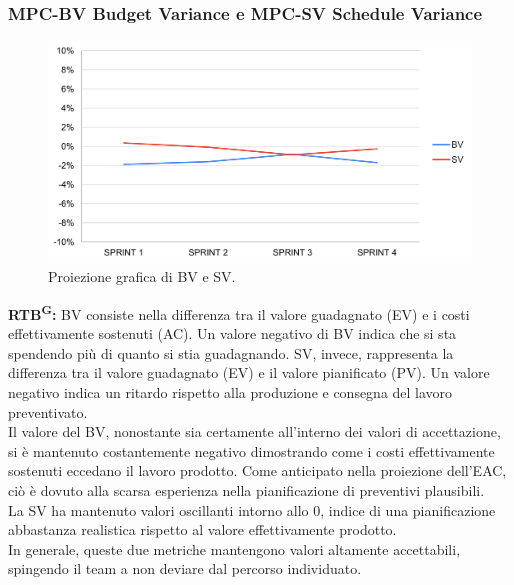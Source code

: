 \documentclass[8pt]{article}
\newcommand{\glossterm}[1]{#1\textsuperscript{G}} %
\begin{document}
\subsubsection{MPC-BV Budget Variance e MPC-SV Schedule Variance}
\begin{figure}[h!]
    \centering
    \includegraphics[width=1\textwidth]{images_pdq/BV_SV.png}
    \caption{Proiezione grafica di BV e SV.}
    \label{fig:Proiezione grafica di BV e SV}
\end{figure}
\textbf{\glossterm{RTB}:} BV consiste nella differenza tra il valore guadagnato (EV) e i costi effettivamente sostenuti (AC). Un valore negativo di BV indica che si sta spendendo più di quanto si stia guadagnando. SV, invece, rappresenta la differenza tra il valore guadagnato (EV) e il valore pianificato (PV). Un valore negativo indica un ritardo rispetto alla produzione e consegna del lavoro preventivato.\\
Il valore del BV, nonostante sia certamente all'interno dei valori di accettazione, si è mantenuto costantemente negativo dimostrando come i costi effettivamente sostenuti eccedano il lavoro prodotto. Come anticipato nella proiezione dell'EAC, ciò è dovuto alla scarsa esperienza nella pianificazione di preventivi plausibili.\\
La SV ha mantenuto valori oscillanti intorno allo 0, indice di una pianificazione abbastanza realistica rispetto al valore effettivamente prodotto.\\
In generale, queste due metriche mantengono valori altamente accettabili, spingendo il team a non deviare dal percorso individuato.
\clearpage
\end{document}
